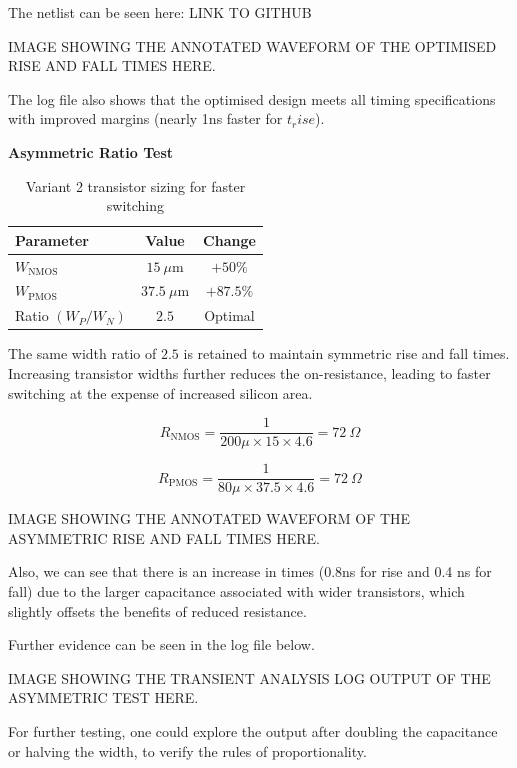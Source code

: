 \documentclass[a4paper,12pt]{article}
\begin{document}
The netlist can be seen here: LINK TO GITHUB

\begin{large}
    IMAGE SHOWING THE ANNOTATED WAVEFORM OF THE OPTIMISED RISE AND FALL TIMES HERE.
\end{large}

The log file also shows that the optimised design meets all timing specifications with improved margins (nearly 1ns faster for $t_rise$).

\textbf{Asymmetric Ratio Test}

\begin{table}[h]
\centering
\begin{tabular}{l c c}
\hline
\textbf{Parameter} & \textbf{Value} & \textbf{Change} \\
\hline
$W_{\text{NMOS}}$ & $15~\mu$m & $+50\%$ \\
$W_{\text{PMOS}}$ & $37.5~\mu$m & $+87.5\%$ \\
Ratio $(W_P/W_N)$ & $2.5$ & Optimal \\
\hline
\end{tabular}
\caption{Variant 2 transistor sizing for faster switching}
\end{table}

The same width ratio of $2.5$ is retained to maintain symmetric rise and fall times. Increasing transistor widths further reduces the on-resistance, leading to faster switching at the expense of increased silicon area.

\[
R_{\text{NMOS}} = \frac{1}{200\mu \times 15 \times 4.6}
= 72~\Omega
\]

\[
R_{\text{PMOS}} = \frac{1}{80\mu \times 37.5 \times 4.6}
= 72~\Omega
\]

\begin{large}
    IMAGE SHOWING THE ANNOTATED WAVEFORM OF THE ASYMMETRIC RISE AND FALL TIMES HERE.
\end{large}

Also, we can see that there is an increase in times (0.8ns for rise and 0.4 ns for fall) due to the larger capacitance associated with wider transistors, which slightly offsets the benefits of reduced resistance.

Further evidence can be seen in the log file below.

\begin{large}
    IMAGE SHOWING THE TRANSIENT ANALYSIS LOG OUTPUT OF THE ASYMMETRIC TEST HERE.
\end{large}

For further testing, one could explore the output after doubling the capacitance or halving the width, to verify the rules of proportionality.
\end{document}
